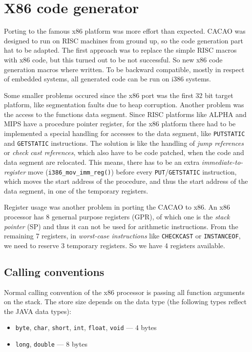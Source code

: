 \section{X86 code generator}

Porting to the famous x86 platform was more effort than
expected. CACAO was designed to run on RISC machines from ground up,
so the code generation part hat to be adapted. The first approach was
to replace the simple RISC macros with x86 code, but this turned out
to be not successful. So new x86 code generation macros where
written. To be backward compatible, mostly in respect of embedded
systems, all generated code can be run on i386 systems.

Some smaller problems occured since the x86 port was the first 32 bit
target platform, like segmentation faults due to heap
corruption. Another problem was the access to the functions data
segment. Since RISC platforms like ALPHA and MIPS have a procedure
pointer register, for the x86 platform there had to be implemented a
special handling for accesses to the data segment, like
\texttt{PUTSTATIC} and \texttt{GETSTATIC} instructions. The solution
is like the handling of \textit{jump references} or \textit{check cast
references}, which also have to be code patched, when the code and
data segment are relocated. This means, there has to be an extra
\textit{immediate-to-register} move (\texttt{i386\_mov\_imm\_reg()})
before every \texttt{PUT}/\texttt{GETSTATIC} instruction, which moves
the start address of the procedure, and thus the start address of the
data segment, in one of the temporary registers.

Register usage was another problem in porting the CACAO to x86. An x86
processor has 8 genernal purpose registers (GPR), of which one is the
\textit{stack pointer} (SP) and thus it can not be used for arithmetic
instructions. From the remaining 7 registers, in \textit{worst-case
instructions} like \texttt{CHECKCAST} or \texttt{INSTANCEOF}, we need
to reserve 3 temporary registers. So we have 4 registers available.


\subsection{Calling conventions}

Normal calling convention of the x86 processor is passing all function
arguments on the stack. The store size depends on the data type (the
following types reflect the JAVA data types):

\begin{itemize}
 \item \texttt{byte}, \texttt{char}, \texttt{short}, \texttt{int},
       \texttt{float}, \texttt{void} --- 4 bytes
 \item \texttt{long}, \texttt{double} --- 8 bytes
\end{itemize}

